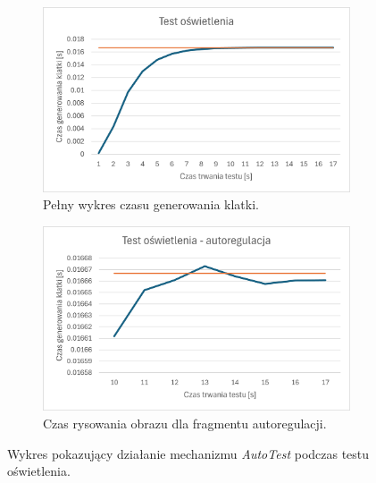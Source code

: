 	\begin{figure}[h!]
\begin{center}
		\begin{subfigure}{.45\textwidth}
			\centering
			\includegraphics[width=\textwidth]{images/LightsTestResult_full.png}
			\caption{Pełny wykres czasu generowania klatki.}
			\label{Test_LightsTest_FullFrameTime}
		\end{subfigure}
		\begin{subfigure}{.45\textwidth}
			\centering
			\includegraphics[width=\textwidth]{images/LightsTestResult_auto.png}
			\caption{Czas rysowania obrazu dla fragmentu autoregulacji.}
			\label{Test_LightsTest_AutoFrameTime}
		\end{subfigure}
		\caption{Wykres pokazujący działanie mechanizmu \textit{AutoTest} podczas testu oświetlenia.}
\end{center}
	\end{figure}
	
